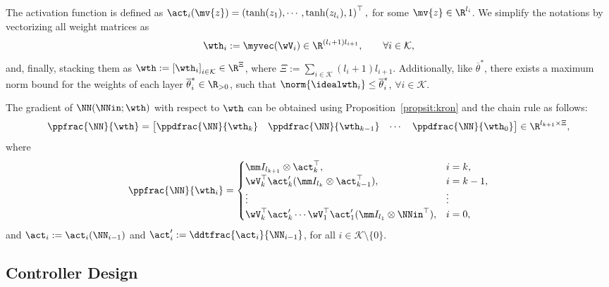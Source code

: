 \documentclass[letterpaper, journal]{IEEEtran}
\begin{document}
The activation function is defined as $\act_i(\mv{z}) = \left(\tanh(z_1),\cdots,\tanh(z_{l_i}),1\right)^\top,$ for some $\mv{z}\in\R^{l_i}$.
We simplify the notations by vectorizing all weight matrices as 
\begin{equation*}
  \wth_i 
  :=
  \myvec(\wV_i)
  \in\R^{(l_i+1)l_{i+1}}
  ,
  \qquad
  \forall 
  i\in\mathcal{K}
  ,
\end{equation*}
and, finally, stacking them as $\wth := \left[\wth_i\right]_{i\in\mathcal{K}}\in\R^\Xi$, where $\Xi := \sum_{i\in\mathcal{K}} (l_i+1)l_{i+1}$.
Additionally, like $\overline{\theta}^*$, there exists a maximum norm bound for the weights of each layer $\overline{\theta}^*_i\in\R_{>0}$, such that $\norm{\idealwth_i}\le\overline{\theta}^*_i$, $\forall i\in\mathcal{K}$.

The gradient of $ \NN(\NNin;\wth)$ with respect to $\wth$ can be obtained using Proposition~\ref{propsit:kron} and the chain rule as follows:
\begin{equation}
  \ppfrac{\NN}{\wth}=
  \begin{bmatrix}
    \ppdfrac{\NN}{\wth_k}&
    \ppdfrac{\NN}{\wth_{k-1}}&
\cdots &
    \ppdfrac{\NN}{\wth_0}
  \end{bmatrix}
  \in\R^{l_{k+1} \times \Xi}
  ,
  \label{eq:gradient:phi}
\end{equation}
where
\begin{equation}
  \ppfrac{\NN}{\wth_i} = 
  \begin{cases}
      \mm I_{l_{k+1}}
      \otimes 
      \act_{k}^\top  
    , 
    &
    i=k
    ,
    \\
    \wV_k^\top\act_{k}' 
    (
      \mm I_{l_{k}}
      \otimes  
      \act_{k-1}^\top  
    )
    , 
    & 
    i=k-1
    ,
    \\
    \vdots 
    &
    \vdots 
    \\
    \wV_k^\top\act'_{k} 
    \cdots 
    \wV_1^\top\act_1' 
    (
      \mm I_{l_1}
      \otimes 
      \NNin^\top  
    )
    , 
    &
    i = 0
    ,
  \end{cases}
  \label{eq:NN:grad}
\end{equation}
and $\act_i:= \act_i(\NN_{i-1})$ and $\act_i':= \ddtfrac{\act_i}{\NN_{i-1}}$, for all $i\in\mathcal{K}\setminus\{0\}$.

\subsection{Controller Design} \label{sec:main:result:sub:ctrl:design}
\end{document}
